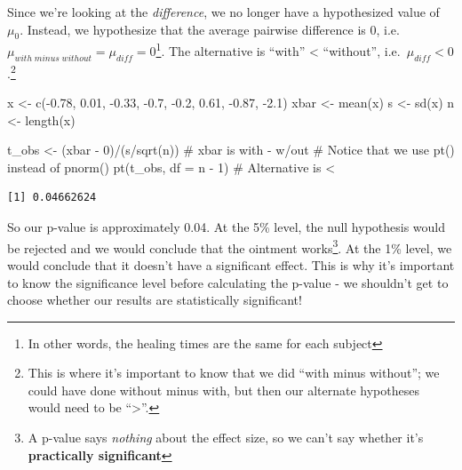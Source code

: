 \documentclass[
  letterpaper,
  DIV=11,
  numbers=noendperiod,
  oneside]{scrreprt}
\newenvironment{Shaded}{\begin{snugshade}}{\end{snugshade}}
\newcommand{\AttributeTok}[1]{\textcolor[rgb]{0.40,0.45,0.13}{#1}}
\newcommand{\CommentTok}[1]{\textcolor[rgb]{0.37,0.37,0.37}{#1}}
\newcommand{\DecValTok}[1]{\textcolor[rgb]{0.68,0.00,0.00}{#1}}
\newcommand{\FloatTok}[1]{\textcolor[rgb]{0.68,0.00,0.00}{#1}}
\newcommand{\FunctionTok}[1]{\textcolor[rgb]{0.28,0.35,0.67}{#1}}
\newcommand{\NormalTok}[1]{\textcolor[rgb]{0.00,0.23,0.31}{#1}}
\newcommand{\OtherTok}[1]{\textcolor[rgb]{0.00,0.23,0.31}{#1}}
\newcommand{\SpecialCharTok}[1]{\textcolor[rgb]{0.37,0.37,0.37}{#1}}
\begin{document}
Since we're looking at the \emph{difference}, we no longer have a
hypothesized value of \(\mu_0\). Instead, we hypothesize that the
average pairwise difference is 0,
i.e.~\(\mu_{with\; minus\; without} = \mu_{diff} = 0\)\footnote{In other
  words, the healing times are the same for each subject}. The
alternative is ``with'' \textless{} ``without'',
i.e.~\(\mu_{diff} < 0\).\footnote{This is where it's important to know
  that we did ``with minus without''; we could have done without minus
  with, but then our alternate hypotheses would need to be
  ``\textgreater{}''.}

\begin{Shaded}
\begin{Highlighting}[]
\NormalTok{x }\OtherTok{\textless{}{-}} \FunctionTok{c}\NormalTok{(}\SpecialCharTok{{-}}\FloatTok{0.78}\NormalTok{, }\FloatTok{0.01}\NormalTok{, }\SpecialCharTok{{-}}\FloatTok{0.33}\NormalTok{, }\SpecialCharTok{{-}}\FloatTok{0.7}\NormalTok{, }\SpecialCharTok{{-}}\FloatTok{0.2}\NormalTok{, }\FloatTok{0.61}\NormalTok{, }\SpecialCharTok{{-}}\FloatTok{0.87}\NormalTok{, }\SpecialCharTok{{-}}\FloatTok{2.1}\NormalTok{)}
\NormalTok{xbar }\OtherTok{\textless{}{-}} \FunctionTok{mean}\NormalTok{(x)}
\NormalTok{s }\OtherTok{\textless{}{-}} \FunctionTok{sd}\NormalTok{(x)}
\NormalTok{n }\OtherTok{\textless{}{-}} \FunctionTok{length}\NormalTok{(x)}

\NormalTok{t\_obs }\OtherTok{\textless{}{-}}\NormalTok{ (xbar }\SpecialCharTok{{-}} \DecValTok{0}\NormalTok{)}\SpecialCharTok{/}\NormalTok{(s}\SpecialCharTok{/}\FunctionTok{sqrt}\NormalTok{(n)) }\CommentTok{\# xbar is with {-} w/out}
\CommentTok{\# Notice that we use pt() instead of pnorm()}
\FunctionTok{pt}\NormalTok{(t\_obs, }\AttributeTok{df =}\NormalTok{ n }\SpecialCharTok{{-}} \DecValTok{1}\NormalTok{) }\CommentTok{\# Alternative is \textless{}}
\end{Highlighting}
\end{Shaded}

\begin{verbatim}
[1] 0.04662624
\end{verbatim}

So our p-value is approximately 0.04. At the 5\% level, the null
hypothesis would be rejected and we would conclude that the ointment
works\footnote{A p-value says \emph{nothing} about the effect size, so
  we can't say whether it's \textbf{practically significant}}. At the
1\% level, we would conclude that it doesn't have a significant effect.
This is why it's important to know the significance level before
calculating the p-value - we shouldn't get to choose whether our results
are statistically significant!
\end{document}

